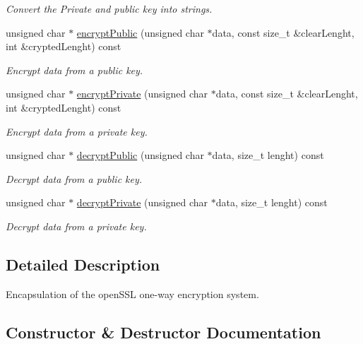 \begin{DoxyCompactItemize}
\begin{DoxyCompactList}\small\item\em Convert the Private and public key into strings. \end{DoxyCompactList}\item 
unsigned char $\ast$ \hyperlink{class_spider_1_1ssl_1_1_r_s_a_keys_a9e391f7d87fe9a8f58119629ed80f9bb}{encrypt\+Public} (unsigned char $\ast$data, const size\+\_\+t \&clear\+Lenght, int \&crypted\+Lenght) const
\begin{DoxyCompactList}\small\item\em Encrypt data from a public key. \end{DoxyCompactList}\item 
unsigned char $\ast$ \hyperlink{class_spider_1_1ssl_1_1_r_s_a_keys_a69c6bda29d2dbec830038b1d0ae92ab0}{encrypt\+Private} (unsigned char $\ast$data, const size\+\_\+t \&clear\+Lenght, int \&crypted\+Lenght) const
\begin{DoxyCompactList}\small\item\em Encrypt data from a private key. \end{DoxyCompactList}\item 
unsigned char $\ast$ \hyperlink{class_spider_1_1ssl_1_1_r_s_a_keys_a9d981778deeb914140ea27e6144721b9}{decrypt\+Public} (unsigned char $\ast$data, size\+\_\+t lenght) const
\begin{DoxyCompactList}\small\item\em Decrypt data from a public key. \end{DoxyCompactList}\item 
unsigned char $\ast$ \hyperlink{class_spider_1_1ssl_1_1_r_s_a_keys_a732ddcc62a20324b3ba10a765276220d}{decrypt\+Private} (unsigned char $\ast$data, size\+\_\+t lenght) const
\begin{DoxyCompactList}\small\item\em Decrypt data from a private key. \end{DoxyCompactList}\end{DoxyCompactItemize}


\subsection{Detailed Description}
Encapsulation of the open\+S\+SL one-\/way encryption system. 

\subsection{Constructor \& Destructor Documentation}
\mbox{\label{class_spider_1_1ssl_1_1_r_s_a_keys_a656fbf95f4ea432cbdbe40c4f0cb57f2}} 

